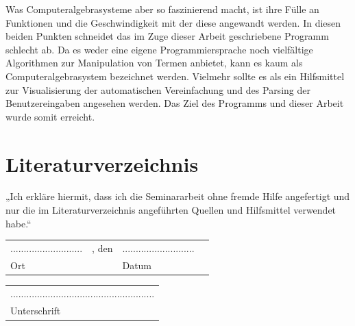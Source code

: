 \documentclass[11pt]{article}
\begin{document}
Was Computeralgebrasysteme aber so faszinierend macht, ist ihre Fülle an Funktionen und die Geschwindigkeit 
mit der diese angewandt werden. In diesen beiden Punkten schneidet das im Zuge dieser Arbeit
geschriebene Programm schlecht ab. Da es weder eine eigene Programmiersprache noch vielfältige Algorithmen
zur Manipulation von Termen anbietet, kann es kaum als Computeralgebrasystem bezeichnet werden.
Vielmehr sollte es als ein Hilfsmittel zur Visualisierung der automatischen Vereinfachung und des Parsing der 
Benutzereingaben angesehen werden. Das Ziel des Programms und dieser Arbeit wurde somit erreicht.

\section{Literaturverzeichnis}
\printbibliography[heading=none]

\newpage

„Ich erkläre hiermit, dass ich die Seminararbeit ohne fremde Hilfe angefertigt 
und nur die im Literaturverzeichnis angeführten Quellen und Hilfsmittel verwendet habe.“

\vspace{40pt}

\begin{tabular}{llll}
  ........................... & , den & ........................... \\ 
  Ort                         &       & Datum                  
\end{tabular}
\hfill
\begin{tabular}{l}
  ...................................................... \\
  Unterschrift
\end{tabular}
 
\end{document}
